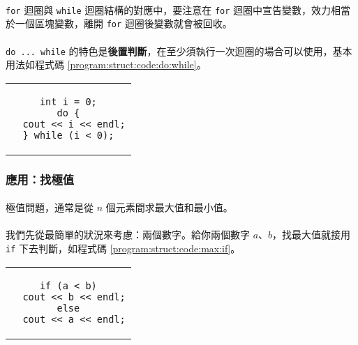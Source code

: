 \documentclass[12pt,a4paper,oneside]{report}
\begin{document}
\begin{CJK}{UTF8}{bkai}
\paragraph{}\lstinline!for! 迴圈與 \lstinline!while! 迴圈結構的對應中，要注意在 \lstinline!for! 迴圈中宣告變數，效力相當於一個區塊變數，離開 \lstinline!for! 迴圈後變數就會被回收。

\paragraph{}\lstinline!do ... while! 的特色是\textbf{後置判斷}，在至少須執行一次迴圈的場合可以使用，基本用法如程式碼 \ref{program:struct:code:do:while}。

\begin{code}[h!]
\centering
\begin{tabular}{c}
\begin{lstlisting}
int i = 0;
do {
  cout << i << endl;
} while (i < 0);
\end{lstlisting}
\end{tabular}
\caption{\lstinline!if! 和 \lstinline!else! 連用}
\label{program:struct:code:do:while}
\end{code}

\subsubsection{應用：找極值}

\paragraph{}極值問題，通常是從 $n$ 個元素間求最大值和最小值。

\paragraph{}我們先從最簡單的狀況來考慮：兩個數字。給你兩個數字 $a$、$b$，找最大值就接用 \lstinline!if! 下去判斷，如程式碼 \ref{program:struct:code:max:if}。

\begin{code}[h!]
\centering
\begin{tabular}{c}
\begin{lstlisting}
if (a < b)
  cout << b << endl;
else
  cout << a << endl;
\end{lstlisting}
\end{tabular}
\caption{\lstinline!if! 求最大值}
\label{program:struct:code:max:if}
\end{code}


\end{CJK}
\end{document}
